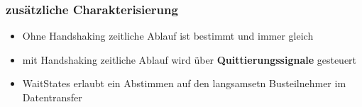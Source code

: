 \subsubsection{zusätzliche Charakterisierung}
\begin{itemize}
    \item Ohne Handshaking
    \subitem zeitliche Ablauf ist bestimmt und immer gleich
    \item mit Handshaking
    \subitem zeitliche Ablauf wird über \textbf{Quittierungssignale} gesteuert
    \item WaitStates
    \subitem erlaubt ein Abstimmen auf den langsamsetn Busteilnehmer im Datentransfer
\end{itemize}

\clearpage

